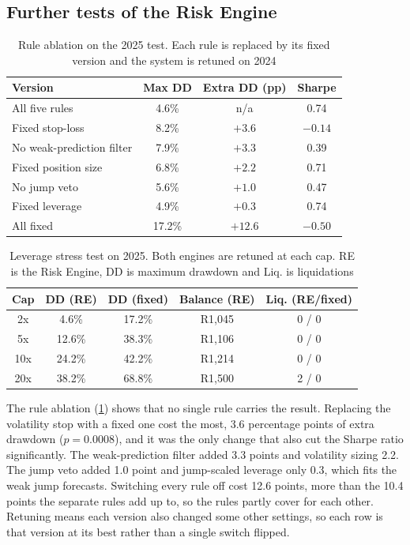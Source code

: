 \subsection{Further tests of the Risk Engine}\label{sec:res-robust}

\begin{table}[!t]
  \centering
  \caption{Rule ablation on the 2025 test. Each rule is replaced by its fixed version and the system is retuned on 2024}
  \label{tab:ablation}
  \footnotesize
  \setlength{\tabcolsep}{4pt}
  \begin{tabular}{@{}lccc@{}}
    \toprule
    Version & Max DD & Extra DD (pp) & Sharpe \\
    \midrule
    All five rules            & 4.6\%  & n/a     & 0.74 \\
    Fixed stop-loss           & 8.2\%  & $+3.6$  & $-0.14$ \\
    No weak-prediction filter & 7.9\%  & $+3.3$  & 0.39 \\
    Fixed position size       & 6.8\%  & $+2.2$  & 0.71 \\
    No jump veto              & 5.6\%  & $+1.0$  & 0.47 \\
    Fixed leverage            & 4.9\%  & $+0.3$  & 0.74 \\
    All fixed                 & 17.2\% & $+12.6$ & $-0.50$ \\
    \bottomrule
  \end{tabular}
\end{table}

\begin{table}[!t]
  \centering
  \caption{Leverage stress test on 2025. Both engines are retuned at each cap. RE is the Risk Engine, DD is maximum drawdown and Liq. is liquidations}
  \label{tab:stress}
  \footnotesize
  \setlength{\tabcolsep}{4pt}
  \begin{tabular}{@{}ccccc@{}}
    \toprule
    Cap & DD (RE) & DD (fixed) & Balance (RE) & Liq. (RE/fixed) \\
    \midrule
    2x  & 4.6\%  & 17.2\% & R1{,}045 & 0 / 0 \\
    5x  & 12.6\% & 38.3\% & R1{,}106 & 0 / 0 \\
    10x & 24.2\% & 42.2\% & R1{,}214 & 0 / 0 \\
    20x & 38.2\% & 68.8\% & R1{,}500 & 2 / 0 \\
    \bottomrule
  \end{tabular}
\end{table}

The rule ablation (\cref{tab:ablation}) shows that no single rule carries the result. Replacing the volatility stop with a fixed one cost the most, 3.6 percentage points of extra drawdown ($p=0.0008$), and it was the only change that also cut the Sharpe ratio significantly. The weak-prediction filter added 3.3 points and volatility sizing 2.2. The jump veto added 1.0 point and jump-scaled leverage only 0.3, which fits the weak jump forecasts. Switching every rule off cost 12.6 points, more than the 10.4 points the separate rules add up to, so the rules partly cover for each other. Retuning means each version also changed some other settings, so each row is that version at its best rather than a single switch flipped.

